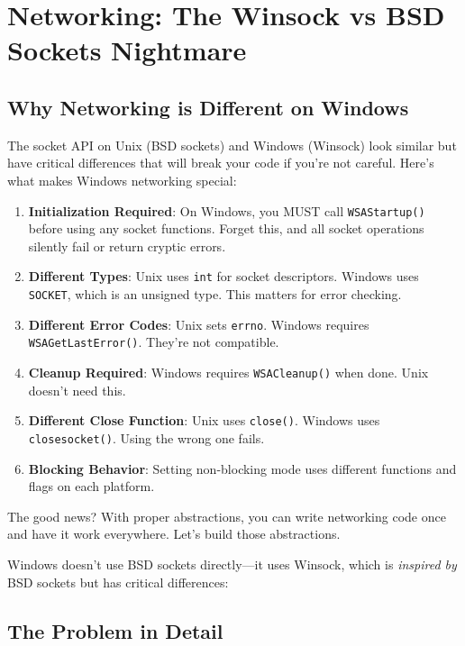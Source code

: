 \section{Networking: The Winsock vs BSD Sockets Nightmare}

\subsection{Why Networking is Different on Windows}

The socket API on Unix (BSD sockets) and Windows (Winsock) look similar but have critical differences that will break your code if you're not careful. Here's what makes Windows networking special:

\begin{enumerate}
    \item \textbf{Initialization Required}: On Windows, you MUST call \texttt{WSAStartup()} before using any socket functions. Forget this, and all socket operations silently fail or return cryptic errors.

    \item \textbf{Different Types}: Unix uses \texttt{int} for socket descriptors. Windows uses \texttt{SOCKET}, which is an unsigned type. This matters for error checking.

    \item \textbf{Different Error Codes}: Unix sets \texttt{errno}. Windows requires \texttt{WSAGetLastError()}. They're not compatible.

    \item \textbf{Cleanup Required}: Windows requires \texttt{WSACleanup()} when done. Unix doesn't need this.

    \item \textbf{Different Close Function}: Unix uses \texttt{close()}. Windows uses \texttt{closesocket()}. Using the wrong one fails.

    \item \textbf{Blocking Behavior}: Setting non-blocking mode uses different functions and flags on each platform.
\end{enumerate}

The good news? With proper abstractions, you can write networking code once and have it work everywhere. Let's build those abstractions.

Windows doesn't use BSD sockets directly---it uses Winsock, which is \textit{inspired by} BSD sockets but has critical differences:


\subsection{The Problem in Detail}

